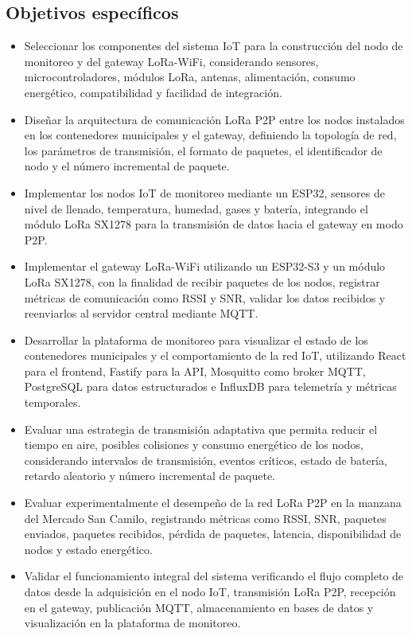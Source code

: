 \subsection{Objetivos específicos}

\begin{itemize}
    \item Seleccionar los componentes del sistema IoT para la construcción del nodo de monitoreo y del gateway LoRa-WiFi, considerando sensores, microcontroladores, módulos LoRa, antenas, alimentación, consumo energético, compatibilidad y facilidad de integración.

    \item Diseñar la arquitectura de comunicación LoRa P2P entre los nodos instalados en los contenedores municipales y el gateway, definiendo la topología de red, los parámetros de transmisión, el formato de paquetes, el identificador de nodo y el número incremental de paquete.

    \item Implementar los nodos IoT de monitoreo mediante un ESP32, sensores de nivel de llenado, temperatura, humedad, gases y batería, integrando el módulo LoRa SX1278 para la transmisión de datos hacia el gateway en modo P2P.

    \item Implementar el gateway LoRa-WiFi utilizando un ESP32-S3 y un módulo LoRa SX1278, con la finalidad de recibir paquetes de los nodos, registrar métricas de comunicación como RSSI y SNR, validar los datos recibidos y reenviarlos al servidor central mediante MQTT.

    \item Desarrollar la plataforma de monitoreo para visualizar el estado de los contenedores municipales y el comportamiento de la red IoT, utilizando React para el frontend, Fastify para la API, Mosquitto como broker MQTT, PostgreSQL para datos estructurados e InfluxDB para telemetría y métricas temporales.

    \item Evaluar una estrategia de transmisión adaptativa que permita reducir el tiempo en aire, posibles colisiones y consumo energético de los nodos, considerando intervalos de transmisión, eventos críticos, estado de batería, retardo aleatorio y número incremental de paquete.

    \item Evaluar experimentalmente el desempeño de la red LoRa P2P en la manzana del Mercado San Camilo, registrando métricas como RSSI, SNR, paquetes enviados, paquetes recibidos, pérdida de paquetes, latencia, disponibilidad de nodos y estado energético.

    \item Validar el funcionamiento integral del sistema verificando el flujo completo de datos desde la adquisición en el nodo IoT, transmisión LoRa P2P, recepción en el gateway, publicación MQTT, almacenamiento en bases de datos y visualización en la plataforma de monitoreo.
\end{itemize}
